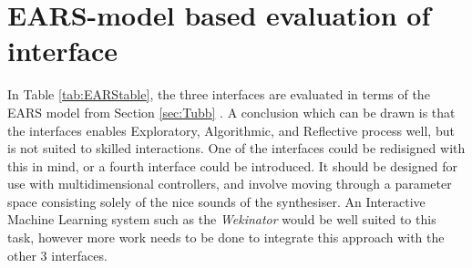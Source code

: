 \documentclass[11pt, oneside]{report}   	%
\begin{document}
\section{EARS-model based evaluation of interface}\label{sec:EARS}
In Table \ref{tab:EARStable}, the three interfaces are evaluated in terms of the EARS model from Section \ref{sec:Tubb} \cite{TubbThesis}.
A conclusion which can be drawn is that the interfaces enables Exploratory, Algorithmic, and Reflective process well, but is not suited to skilled interactions. One of the interfaces could be redisigned with this in mind, or a fourth interface could be introduced.  It should be designed for use with multidimensional controllers, and involve moving through a parameter space consisting solely of the nice sounds of the synthesiser. An Interactive Machine Learning system such as the \emph{Wekinator} \cite{Wekinator} would be well suited to this task, however more work needs to be done to integrate this approach with the other 3 interfaces.
\end{document}
